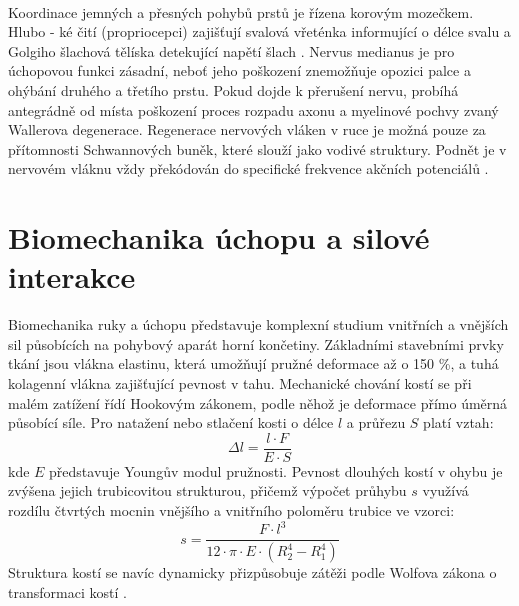 \paragraph{}Koordinace jemných a přesných pohybů prstů je řízena korovým mozečkem. Hlubo -    ké čití (propriocepci) zajišťují svalová vřeténka informující o délce svalu a Golgiho šlachová tělíska detekující napětí šlach \cite{Stuchla2024}. Nervus medianus je pro úchopovou funkci zásadní, neboť jeho poškození znemožňuje opozici palce a ohýbání druhého a třetího prstu. Pokud dojde k přerušení nervu, probíhá antegrádně od místa poškození proces rozpadu axonu a myelinové pochvy zvaný Wallerova degenerace. Regenerace nervových vláken v ruce je možná pouze za přítomnosti Schwannových buněk, které slouží jako vodivé struktury. Podnět je v nervovém vláknu vždy překódován do specifické frekvence akčních potenciálů \cite{Cihak2016}.


\section{Biomechanika úchopu a silové interakce}

Biomechanika ruky a úchopu představuje komplexní studium vnitřních a vnějších sil působících na pohybový aparát horní končetiny. Základními stavebními prvky tkání jsou vlákna elastinu, která umožňují pružné deformace až o 150 \%, a tuhá kolagenní vlákna zajišťující pevnost v tahu. Mechanické chování kostí se při malém zatížení řídí Hookovým zákonem, podle něhož je deformace přímo úměrná působící síle. Pro natažení nebo stlačení kosti o délce $l$ a průřezu $S$ platí vztah:
\begin{equation}
\Delta l = \frac{l \cdot F}{E \cdot S}
\end{equation}
kde $E$ představuje Youngův modul pružnosti. Pevnost dlouhých kostí v ohybu je zvýšena jejich trubicovitou strukturou, přičemž výpočet průhybu $s$ využívá rozdílu čtvrtých mocnin vnějšího a vnitřního poloměru trubice ve vzorci:
\begin{equation}
s = \frac{F \cdot l^3}{12 \cdot \pi \cdot E \cdot (R_2^4 - R_1^4)}
\end{equation} 
Struktura kostí se navíc dynamicky přizpůsobuje zátěži podle Wolfova zákona o transformaci kostí \cite{Benes2022}.

